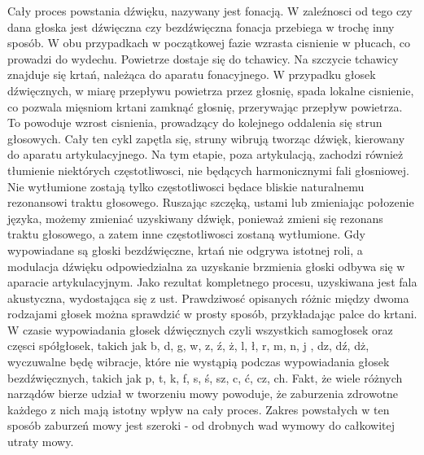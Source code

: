 \documentclass[a4paper,12 pt]{article}
\begin{document}
Cały proces powstania dźwięku, nazywany jest fonacją. W zaleźnosci od tego czy dana głoska jest dźwięczna czy bezdźwięczna fonacja przebiega w trochę inny sposób. W obu przypadkach w początkowej fazie wzrasta cisnienie w płucach, co prowadzi do wydechu. Powietrze dostaje się do tchawicy. Na szczycie tchawicy znajduje się krtań, należąca do aparatu fonacyjnego. W przypadku głosek dźwięcznych, w miarę przepływu powietrza przez głosnię, spada lokalne cisnienie, co pozwala mięsniom krtani zamknąć głosnię, przerywając przepływ powietrza. To powoduje wzrost cisnienia, prowadzący do kolejnego oddalenia się strun głosowych. Cały ten cykl zapętla się, struny wibrują tworząc dźwięk, kierowany do aparatu artykulacyjnego. Na tym etapie, poza artykulacją, zachodzi również tłumienie niektórych częstotliwosci, nie będących harmonicznymi fali głosniowej. Nie wytłumione zostają tylko częstotliwosci będace bliskie naturalnemu rezonansowi traktu głosowego. Ruszając szczęką, ustami lub zmieniając połozenie języka, możemy zmieniać uzyskiwany dźwięk, ponieważ zmieni się rezonans traktu głosowego, a zatem inne częstotliwosci zostaną wytłumione. Gdy wypowiadane są głoski bezdźwięczne, krtań nie odgrywa istotnej roli, a modulacja dźwięku odpowiedzialna za uzyskanie brzmienia głoski odbywa się w aparacie artykulacyjnym. Jako rezultat kompletnego procesu, uzyskiwana jest fala akustyczna, wydostająca się z ust. Prawdziwosć opisanych różnic między dwoma rodzajami głosek można sprawdzić w prosty sposób, przykładając palce do krtani. W czasie wypowiadania głosek dźwięcznych czyli wszystkich samogłosek oraz częsci spółgłosek, takich jak b, d, g, w, z, ź, ż, l, ł, r, m, n, j , dz, dź, dż, wyczuwalne będę wibracje, które nie wystąpią podczas wypowiadania głosek bezdźwięcznych, takich jak p, t, k, f, s, ś, sz, c, ć, cz, ch.
Fakt, że wiele różnych narządów bierze udział w tworzeniu mowy powoduje, że zaburzenia zdrowotne każdego z nich mają istotny wpływ na cały proces. Zakres powstałych w ten sposób zaburzeń mowy jest szeroki - od drobnych wad wymowy do całkowitej utraty mowy.
\end{document}
